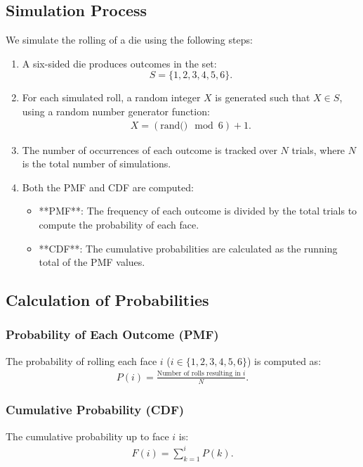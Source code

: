 \documentclass[journal]{IEEEtran}
\begin{document}
\subsection*{Simulation Process}
We simulate the rolling of a die using the following steps:
\begin{enumerate}
    \item A six-sided die produces outcomes in the set:
    \[
    S = \{1, 2, 3, 4, 5, 6\}.
    \]
    \item For each simulated roll, a random integer \( X \) is generated such that \( X \in S \), using a random number generator function:
    \begin{align}
    X = (\text{rand()} \mod 6) + 1.
     \end{align}
    \item The number of occurrences of each outcome is tracked over \( N \) trials, where \( N \) is the total number of simulations.
    \item Both the PMF and CDF are computed:
    \begin{itemize}
        \item **PMF**: The frequency of each outcome is divided by the total trials to compute the probability of each face.
        \item **CDF**: The cumulative probabilities are calculated as the running total of the PMF values.
    \end{itemize}
\end{enumerate}

\subsection*{Calculation of Probabilities}
\subsubsection*{Probability of Each Outcome (PMF)}
The probability of rolling each face \( i \) (\( i \in \{1, 2, 3, 4, 5, 6\} \)) is computed as:
\begin{align}
P(i) = \frac{\text{Number of rolls resulting in } i}{N}.
\end{align}

\subsubsection*{Cumulative Probability (CDF)}
The cumulative probability up to face \( i \) is:
\begin{align}
F(i) = \sum_{k=1}^{i} P(k).
\end{align}
\end{document}
